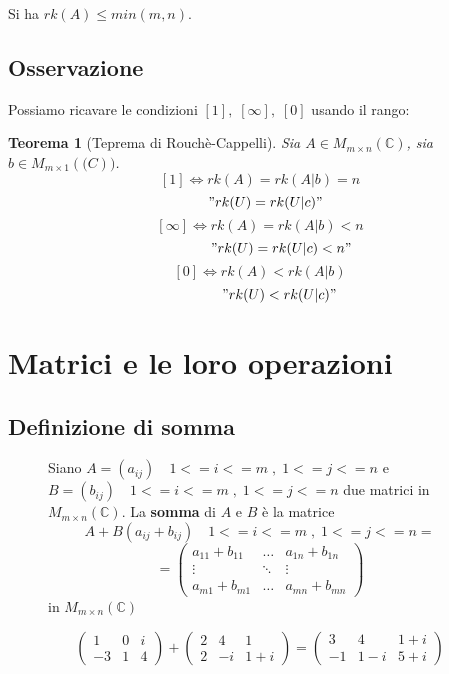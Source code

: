 \documentclass[a4paper]{article}
\newtheorem{theorem}{Teorema}
\theoremstyle{break}
\theoremstyle{break}
\theoremstyle{break}
\theoremstyle{break}
\begin{document}
\noindent Si ha \( rk(A) \le min(m,n) \).

\subsection{Osservazione}
Possiamo ricavare le condizioni \( [1],\;[\infty],\;[0] \) usando il rango:

\begin{theorem}[Teprema di Rouchè-Cappelli]
	Sia \( A \in M_{m \times n}(\mathbb{C}) \), sia \( b \in M_{m \times 1}(\mathbb(C)) \).
	\[
		[1] \Leftrightarrow rk(A) = rk(A|b) = n
	\]
	\[
		\hspace{0.3cm} "rk(U) = rk(U|c)"
	\]
	\vspace{0.05cm}
	\[
		[\infty] \Leftrightarrow rk(A) = rk(A|b) < n
	\]
	\[
		\hspace{1.1cm} "rk(U) = rk(U|c) < n"
	\]
	\vspace{0.05cm}
	\[
		[0] \Leftrightarrow rk(A) < rk(A|b)
	\]
	\[
		\hspace{1cm} "rk(U) < rk(U|c)"
	\]
\end{theorem}

\section{Matrici e le loro operazioni}
\subsection{Definizione di somma}
\begin{figure}[H]
  \begin{definition}
    Siano \( A=(a_{ij}) \quad 1<=i<=m \; , \; 1<=j<=n \) e 
    \( B=(b_{ij}) \quad 1<=i<=m \; , \; 1<=j<=n \) due matrici in \( M_{m \times n}(\mathbb{C}) \).
    La \textbf{somma} di \( A \) e \( B \) è la matrice \[
    A + B (a_{ij} + b_{ij}) \quad 1<=i<=m\;,\;1<=j<=n  = 
  \] 
  \[
    = \begin{pmatrix} 
      a_{11} + b_{11} & \ldots & a_{1n} + b_{1n} \\
      \vdots          & \ddots & \vdots          \\
      a_{m1} + b_{m1} & \ldots & a_{mn} + b_{mn}
    \end{pmatrix} 
  \] 
  in \( M_{m \times n}(\mathbb{C}) \) 
  \end{definition}
\end{figure}
\begin{figure}[H]
  \begin{example}
    \[
    \begin{pmatrix} 
      1 & 0 & i \\
      -3 & 1 & 4
    \end{pmatrix} 
    +
    \begin{pmatrix} 
      2 & 4 & 1 \\
      2 & -i & 1+i 
    \end{pmatrix} 
    =
    \begin{pmatrix} 
      3 & 4 & 1+i \\
      -1 & 1-i & 5+i
    \end{pmatrix}
    \]
  \end{example}
\end{figure}
\end{document}
